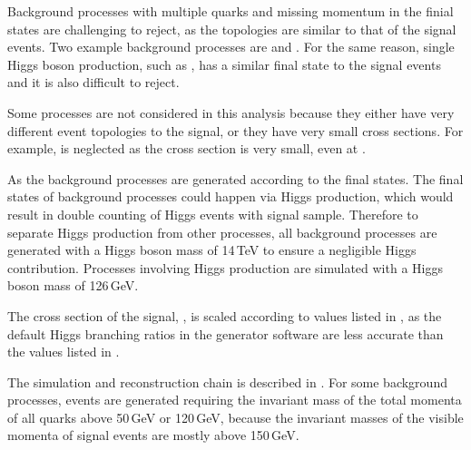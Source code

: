 
Background processes with multiple quarks and missing momentum in the finial states are challenging to reject, as the topologies are similar to that of the signal events. Two example background processes are \eeTo{ \Pquark \Pquark \Pquark \Pquark \Pnu \APnu} and \HepProcess{\Pepm\Pphoton \to \Pnu \Pquark \Pquark \Pquark \Pquark}. For the same reason, single Higgs boson production, such as \eeTo{\Pquark \Pquark \PHiggs \Pnu \APnu}, has a similar final state to the signal events and it is also difficult to reject.

Some processes are not considered in this analysis because they either have very different event topologies to the signal, or they have very small cross sections. For example,  \HepProcess{\Egamma   \to \Pquark \Pquark \PHiggs \Plepton} is neglected  as the cross section is very small, even at .

As the background processes are generated according to the final states. The final states of background processes could happen via Higgs production, which would result in double counting of Higgs events with signal sample.  Therefore to separate Higgs production from other processes, all background processes are generated with a Higgs boson mass of 14\,TeV to ensure a negligible Higgs contribution. Processes involving Higgs production are simulated with a Higgs boson mass of 126\,GeV.

The cross section of the signal, \eeToHHbbWW, is scaled according to values listed in \cite{Dittmaier:2012vm}, as the default Higgs branching ratios in the generator software are less accurate than the values listed in \cite{Dittmaier:2012vm}.


The simulation and reconstruction chain is described in . For some background processes, events are generated requiring the invariant mass of the total momenta of all quarks above 50\,GeV or 120\,GeV, because the invariant masses of the visible momenta of signal events are mostly above 150\,GeV.

